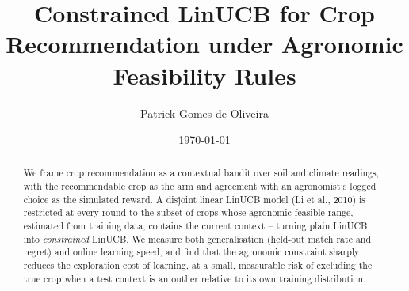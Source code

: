 \documentclass[10pt,twocolumn]{article}
\title{Constrained LinUCB for Crop Recommendation under Agronomic Feasibility Rules}
\author{Patrick Gomes de Oliveira}
\date{\today}
\begin{document}
\maketitle
\begin{abstract}
We frame crop recommendation as a contextual bandit over soil and climate
readings, with the recommendable crop as the arm and agreement with an
agronomist's logged choice as the simulated reward. A disjoint linear
LinUCB model (Li et al., 2010) is restricted at every round to the subset
of crops whose agronomic feasible range, estimated from training data,
contains the current context -- turning plain LinUCB into \emph{constrained}
LinUCB. We measure both generalisation (held-out match rate and regret) and
online learning speed, and find that the agronomic constraint sharply
reduces the exploration cost of learning, at a small, measurable risk of
excluding the true crop when a test context is an outlier relative to its
own training distribution.
\end{abstract}









\end{document}
